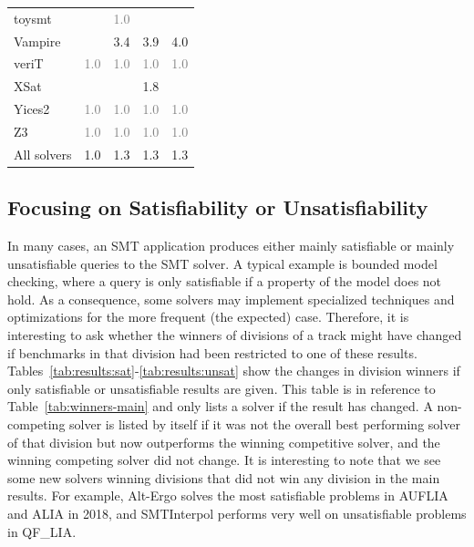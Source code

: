 \documentclass[dvipsnames,table,twoside,11pt]{article}
\begin{document}
\begin{table}
\begin{tabular}{lrrrr}
    toysmt            &     & \textcolor{gray}{1.0} &     &     \\
    Vampire           &     & 3.4 & 3.9 & 4.0 \\
    veriT             & \textcolor{gray}{1.0} & \textcolor{gray}{1.0} & \textcolor{gray}{1.0} & \textcolor{gray}{1.0} \\
    XSat              &     &     & 1.8 &     \\
    Yices2            & \textcolor{gray}{1.0} & \textcolor{gray}{1.0} & \textcolor{gray}{1.0} & \textcolor{gray}{1.0} \\
    Z3                & \textcolor{gray}{1.0} & \textcolor{gray}{1.0} & \textcolor{gray}{1.0} & \textcolor{gray}{1.0} \\
    \midrule
    All solvers       & 1.0 & 1.3 & 1.3 & 1.3 \\
    \bottomrule
  \end{tabular}
\end{table}

\subsection{Focusing on Satisfiability or Unsatisfiability}

In many cases, an SMT application produces either mainly satisfiable or mainly
unsatisfiable queries to the SMT solver.  A typical example is bounded model checking,
where a query is only satisfiable if a property of the model does not hold.  As
a consequence, some solvers may implement specialized techniques and
optimizations for the more frequent (the expected) case.
%
Therefore, it is interesting to ask whether the winners of divisions of a track
might have changed if benchmarks in that division had been restricted to one of
these results.  Tables~\ref{tab:results:sat}-\ref{tab:results:unsat} show the
changes in division winners if only satisfiable or unsatisfiable results are
given. This table is in reference to Table~\ref{tab:winners-main} and only
lists a solver if the result has changed. A non-competing solver is listed by
itself if it was not the overall best performing solver of that division but
now outperforms the winning competitive solver, and the winning competing
solver did not change.
It is interesting to note that we see some new solvers winning divisions that did not win any division in the main results. For example, Alt-Ergo solves the most satisfiable problems in AUFLIA and ALIA in 2018, and SMTInterpol performs very well on unsatisfiable problems in QF\_LIA.
\end{document}
